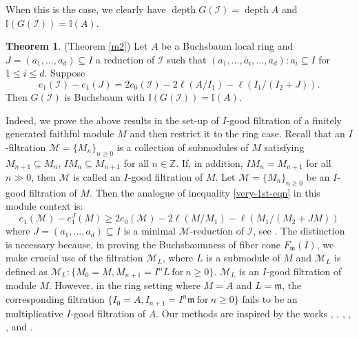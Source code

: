 \documentclass[11pt,reqno]{amsart}
\theoremstyle{definition}
\newcommand{\m}{\mathfrak m}
\def\M{{\mathcal M}}
\def\I{{\mathcal I}}
\newtheorem{mainthm}{Theorem}
\DeclareMathOperator{\h}{H}
\DeclareMathOperator{\depth}{depth}
\numberwithin{equation}{section}
\begin{document}
	 When this is the case, we clearly have $\depth G(\I)=\depth A$ and $\mathbb{I}(G(\I))=\mathbb{I}(A)$. 
\begin{mainthm}\label{t2}(Theorem \ref{m2})
		 		 	Let $A$ be a Buchsbaum local ring and   $J=(a_1,\ldots,a_d)\subseteq I$ a reduction of $\I$  such that $(a_1,\ldots, \check{a_i},\ldots,a_d):a_i\subseteq I$ for $1\leq i\leq d$. Suppose \begin{equation*}e_1(\I)-e_1(J)=2e_0(\I)-2\ell(A/I_1)-\ell(I_1/(I_2+J)).\end{equation*} Then $G(\I)$ is Buchsbaum with $\mathbb{I}(G(\I))=\mathbb{I}(A)$.
		 \end{mainthm}
Indeed, we prove the above results in the set-up of $I$-good filtration of a finitely generated faithful module $M$ and then restrict it to the ring case. Recall that an $I$-filtration  $\M=\{M_n\}_{n\geq 0}$ is a collection of submodules of $M$ satisfying $M_{n+1}\subseteq M_n$, $IM_n\subseteq M_{n+1}$ for all $n\in \mathbb{Z}$. If, in addition, $IM_n=M_{n+1}$ for all $n\gg 0$, then $\M$ is called an $I$-good filtration of $M$.       
      Let $\M=\{M_n\}_{n\geq 0}$ be an $I$-good filtration of $M$. Then the analogue of inequality \eqref{very-1st-eqn} in this module context is: 
	 \begin{equation}\label{very-1st-eqn(a)}
	 	e_1(\M)-e_1^J(M)\geq 2e_0(\M)-2\ell(M/M_1)-\ell(M_1/(M_2+JM)) \end{equation}
	 where $J=(a_1,\ldots,a_d)\subseteq I$ is a minimal $\M$-reduction of $\I$, see
	 \cite[Theorem 2.4]{rossi-valla}.  The distinction is necessary because, in proving the Buchsbaumness of fiber cone $F_\m(I)$, we make crucial use of the filtration $\M_L$, where $L$ is a submodule of $M$ and  $\M_L$ is defined as $
     \M_L:\{ M_0=M, M_{n+1}=I^nL ~\mbox{for}~ n\geq 0\}.$ $\M_L$ is an $I$-good filtration of module $M$. However, in the ring setting where $M=A$ and $L=\m$, the corresponding filtration $\{I_0=A, I_{n+1}=I^n\m ~\text{for}~ n\geq 0\}$ fails to be an multiplicative $I$-good filtration of $A$.
Our methods are inspired by the works \cite{Corso09}, \cite{CPV}, \cite{ozeki12}, \cite{ozeki13}, \cite{rossi-valla}, and \cite{sal20}.
\end{document}

